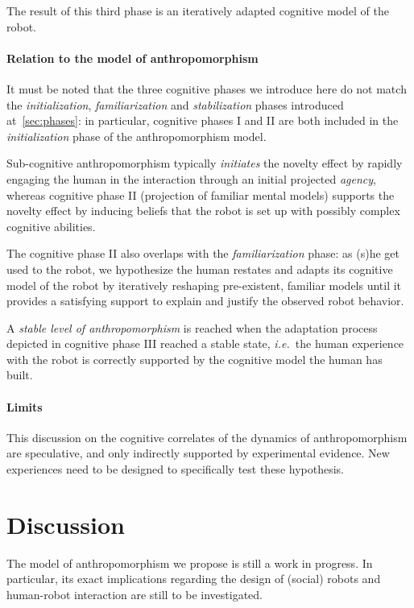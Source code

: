 \documentclass{acm_proc_article-sp}
\newcommand{\ie}{{\textit{i.e.~}}}
\begin{document}
The result of this third phase is an iteratively adapted cognitive model of the
robot.

\paragraph{Relation to the model of anthropomorphism} It must be noted that the
three cognitive phases we introduce here do not match the
\emph{initialization}, \emph{familiarization} and \emph{stabilization} phases
introduced at~\ref{sec:phases}: in particular, cognitive phases I and II are
both included in the \emph{initialization} phase of the anthropomorphism model.

Sub-cognitive anthropomorphism typically \emph{initiates} the novelty effect by
rapidly engaging the human in the interaction through an initial projected
\emph{agency}, whereas cognitive phase II (projection of familiar mental
models) supports the novelty effect by inducing beliefs that the robot is set
up with possibly complex cognitive abilities.

The cognitive phase II also overlaps with the \emph{familiarization} phase: as
(s)he get used to the robot, we hypothesize the human restates and adapts its
cognitive model of the robot by iteratively reshaping pre-existent, familiar
models until it provides a satisfying support to explain and justify the
observed robot behavior.

A \emph{stable level of anthropomorphism} is reached when the adaptation
process depicted in cognitive phase III reached a stable state, \ie the human
experience with the robot is correctly supported by the cognitive model the
human has built.

\paragraph{Limits} This discussion on the cognitive correlates of the dynamics
of anthropomorphism are speculative, and only indirectly supported by
experimental evidence. New experiences need to be designed to specifically test
these hypothesis.

\section{Discussion}
\label{sec:discussion}

The model of anthropomorphism we propose is still a work in progress. In
particular, its exact implications regarding the design of (social) robots and
human-robot interaction are still to be investigated.
\end{document}
